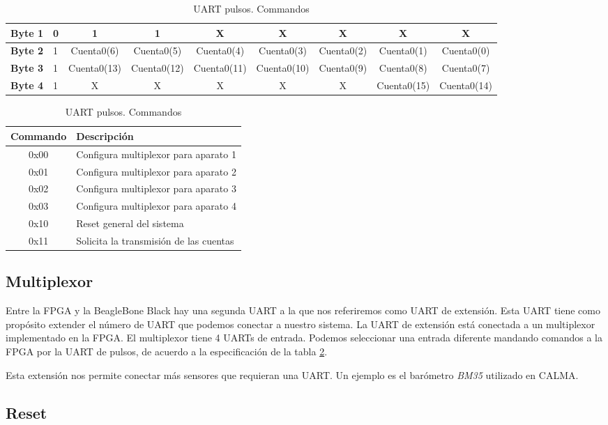 \begin{table}[h]
\begin{tabularx}{\textwidth}{|l|X|c|c|c|c|c|c|c|}
				\cellcolor[HTML]{C0C0C0}\textbf{Byte 1} & 0 & 1           & 1  		& X	      & X	    & X	  	 & X	       & X	     	\\ \hline
				\cellcolor[HTML]{C0C0C0}\textbf{Byte 2} & 1 & Cuenta0(6)  & Cuenta0(5) 	& Cuenta0(4)  & Cuenta0(3)  & Cuenta0(2) & Cuenta0(1)  & Cuenta0(0)  	\\ \hline
				\cellcolor[HTML]{C0C0C0}\textbf{Byte 3} & 1 & Cuenta0(13) & Cuenta0(12)	& Cuenta0(11) & Cuenta0(10) & Cuenta0(9) & Cuenta0(8)  & Cuenta0(7)  	\\ \hline
				\cellcolor[HTML]{C0C0C0}\textbf{Byte 4} & 1 & X		  & X	 	& X	      & X	    & X		 & Cuenta0(15) & Cuenta0(14)	\\ \hline
			\end{tabularx}
			\caption{UART pulsos. Palabra de datos}
			\label{tab:FPGAUartCont}
			\begin{tabularx}{\hsize}{|c|X|}
		  		\hline
				\rowcolor[HTML]{C0C0C0} 
		  		Commando & Descripción                            \\\hline
		  		0x00     & Configura multiplexor para aparato 1   \\\hline
		  		0x01     & Configura multiplexor para aparato 2   \\\hline
		  		0x02     & Configura multiplexor para aparato 3   \\\hline
		  		0x03     & Configura multiplexor para aparato 4   \\\hline
		  		0x10     & Reset general del sistema              \\\hline
		  		0x11     & Solicita la transmisión de las cuentas \\\hline
			\end{tabularx}
			\caption{UART pulsos. Commandos}
			\label{tab:FPGAUartComm}
		\end{table}
	\subsection{Multiplexor}
	Entre la FPGA y la BeagleBone Black hay una segunda UART a la que nos referiremos como UART de extensión. Esta UART tiene como propósito
	extender el número de UART que podemos conectar a nuestro sistema. La UART de extensión está conectada a un multiplexor implementado en la
	FPGA. El multiplexor tiene 4 UARTs de entrada. Podemos seleccionar una entrada diferente mandando comandos a la FPGA por la UART de pulsos,
	de acuerdo a la especificación de la tabla \ref{tab:FPGAUartComm}.
	\par
	Esta extensión nos permite conectar más sensores que requieran una UART. Un ejemplo es el barómetro \emph{BM35}\cite{BM35} utilizado en CALMA.

	\subsection{Reset}

